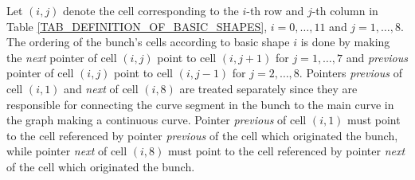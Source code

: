 Let $(i, j)$ denote the cell corresponding to the $i$-th row and
$j$-th column in Table \ref{TAB_DEFINITION_OF_BASIC_SHAPES},
$i=0,\ldots , 11$ and $j=1,\ldots , 8$. The ordering of the bunch's
cells according to basic shape $i$ is done by making the
\textit{next} pointer of cell $(i,j)$ point to cell $(i, j+1)$ for
$j=1,\ldots , 7$ and \textit{previous} pointer of cell $(i,j)$ point
to cell $(i, j-1)$ for $j=2,\ldots , 8$. Pointers \textit{previous}
of cell $(i,1)$ and \textit{next} of cell $(i,8)$ are treated
separately since they are responsible for connecting the curve
segment in the bunch to the main curve in the graph making a
continuous curve. Pointer \textit{previous} of cell $(i,1)$ must
point to the cell referenced by pointer \textit{previous} of the
cell which originated the bunch, while pointer \textit{next} of cell
$(i,8)$ must point to the cell referenced by pointer \textit{next}
of the cell which originated the bunch.

